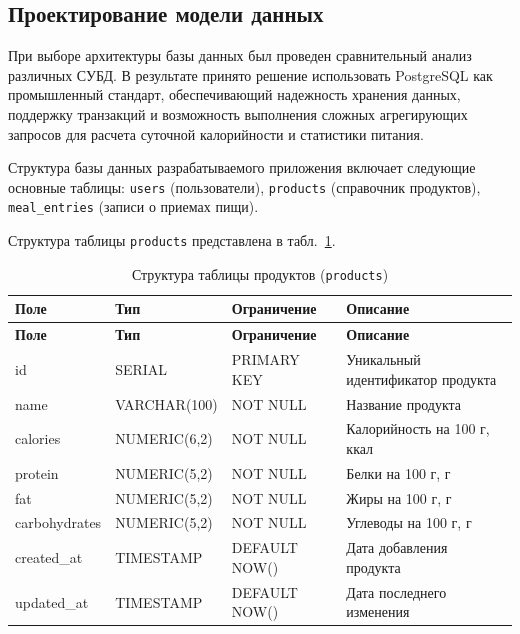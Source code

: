 \subsection{Проектирование модели данных}

При выборе архитектуры базы данных был проведен сравнительный анализ различных СУБД. В результате принято решение использовать PostgreSQL как промышленный стандарт, обеспечивающий надежность хранения данных, поддержку транзакций и возможность выполнения сложных агрегирующих запросов для расчета суточной калорийности и статистики питания.

Структура базы данных разрабатываемого приложения включает следующие основные таблицы: \texttt{users} (пользователи), \texttt{products} (справочник продуктов), \texttt{meal\_entries} (записи о приемах пищи). 

Структура таблицы \texttt{products} представлена в табл.~\ref{tab:db_products}.

\begin{longtable}{|l|l|p{3.5cm}|p{5.5cm}|}
	\caption{Структура таблицы продуктов (\texttt{products})} \label{tab:db_products} \\

	\hline
	\textbf{Поле} & \textbf{Тип} & \textbf{Ограничение} & \textbf{Описание} \\ \hline
	\endfirsthead
	
	\tabcont{\ref{tab:db_products}}
	\textbf{Поле} & \textbf{Тип} & \textbf{Ограничение} & \textbf{Описание} \\ \hline
	\endhead
	
	\hline
	\endfoot
	
	\hline
	\endlastfoot

	id & SERIAL & PRIMARY KEY & Уникальный идентификатор продукта \\ \hline
	name & VARCHAR(100) & NOT NULL & Название продукта \\ \hline
	calories & NUMERIC(6,2) & NOT NULL & Калорийность на 100 г, ккал \\ \hline
	protein & NUMERIC(5,2) & NOT NULL & Белки на 100 г, г \\ \hline
	fat & NUMERIC(5,2) & NOT NULL & Жиры на 100 г, г \\ \hline
	carbohydrates & NUMERIC(5,2) & NOT NULL & Углеводы на 100 г, г \\ \hline
	created\_at & TIMESTAMP & DEFAULT NOW() & Дата добавления продукта \\ \hline
	updated\_at & TIMESTAMP & DEFAULT NOW() & Дата последнего изменения \\ \hline
\end{longtable}

